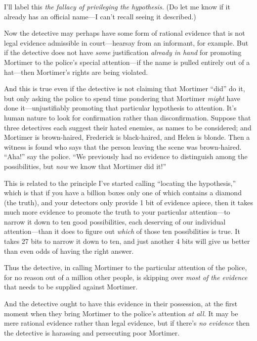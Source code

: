 {
 I'll label this \textit{the fallacy of privileging
the hypothesis.} (Do let me know if it already has an official name---I
can't recall seeing it described.)}

{
 Now the detective may perhaps have some form of rational evidence
that is not legal evidence admissible in court---hearsay from an
informant, for example. But if the detective does not have
\textit{some} justification \textit{already in hand} for promoting
Mortimer to the police's special attention---if the
name is pulled entirely out of a hat---then Mortimer's
rights are being violated.}

{
 And this is true even if the detective is not claiming that
Mortimer ``did'' do it, but only
asking the police to spend time pondering that Mortimer \textit{might}
have done it---unjustifiably promoting that particular hypothesis to
attention. It's human nature to look for confirmation
rather than disconfirmation. Suppose that three detectives each suggest
their hated enemies, as names to be considered; and Mortimer is
brown-haired, Frederick is black-haired, and Helen is blonde. Then a
witness is found who says that the person leaving the scene was
brown-haired. ``Aha!'' say the
police. ``We previously had no evidence to distinguish
among the possibilities, but \textit{now} we know that Mortimer did
it!''}

{
 This is related to the principle I've started
calling ``locating the hypothesis,''
which is that if you have a billion boxes only one of which contains a
diamond (the truth), and your detectors only provide 1 bit of evidence
apiece, then it takes much more evidence to promote the truth to your
particular attention---to narrow it down to ten good possibilities,
each deserving of our individual attention---than it does to figure out
\textit{which} of those ten possibilities is true. It takes 27 bits to
narrow it down to ten, and just another 4 bits will give us better than
even odds of having the right answer.}

{
 Thus the detective, in calling Mortimer to the particular
attention of the police, for no reason out of a million other people,
is skipping over \textit{most of the evidence} that needs to be
supplied against Mortimer.}

{
 And the detective ought to have this evidence in their possession,
at the first moment when they bring Mortimer to the
police's attention \textit{at all.} It may be mere
rational evidence rather than legal evidence, but if
there's \textit{no evidence} then the detective is
harassing and persecuting poor Mortimer.}

